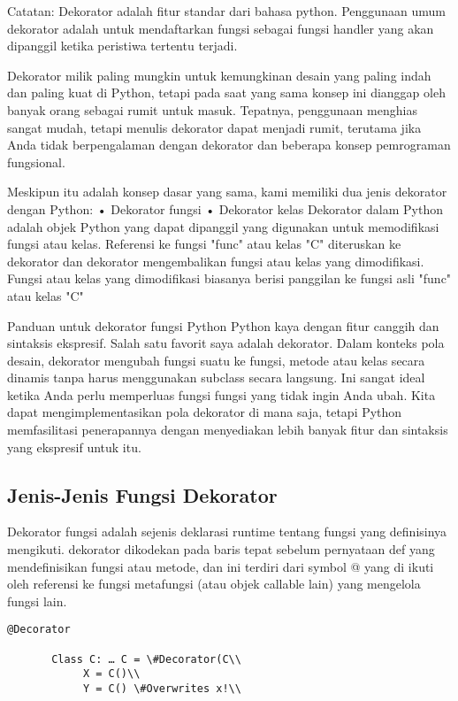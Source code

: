 \documentclass[12pt,a4paper]{article}
\begin{document}
Catatan:
Dekorator adalah fitur standar dari bahasa python. Penggunaan umum dekorator adalah untuk mendaftarkan fungsi sebagai fungsi handler yang akan dipanggil ketika peristiwa tertentu terjadi.

Dekorator milik paling mungkin untuk kemungkinan desain yang paling indah dan paling kuat di Python, tetapi pada saat yang sama konsep ini dianggap oleh banyak orang sebagai rumit untuk masuk. Tepatnya, penggunaan menghias sangat mudah, tetapi menulis dekorator dapat menjadi rumit, terutama jika Anda tidak berpengalaman dengan dekorator dan beberapa konsep pemrograman fungsional. 

Meskipun itu adalah konsep dasar yang sama, kami memiliki dua jenis dekorator dengan Python:
•	Dekorator fungsi
•	Dekorator kelas
Dekorator dalam Python adalah objek Python yang dapat dipanggil yang digunakan untuk memodifikasi fungsi atau kelas. Referensi ke fungsi "func" atau kelas "C" diteruskan ke dekorator dan dekorator mengembalikan fungsi atau kelas yang dimodifikasi. Fungsi atau kelas yang dimodifikasi biasanya berisi panggilan ke fungsi asli "func" atau kelas 
"C"


Panduan untuk dekorator fungsi Python
Python kaya dengan fitur canggih dan sintaksis ekspresif. Salah satu favorit saya adalah dekorator. Dalam konteks pola desain, dekorator mengubah fungsi suatu ke fungsi, metode atau kelas secara dinamis tanpa harus menggunakan subclass secara langsung. Ini sangat ideal ketika Anda perlu memperluas fungsi fungsi yang tidak ingin Anda ubah. Kita dapat mengimplementasikan pola dekorator di mana saja, tetapi Python memfasilitasi penerapannya dengan menyediakan lebih banyak fitur dan sintaksis yang ekspresif untuk itu.

\subsection{Jenis-Jenis Fungsi Dekorator}


Dekorator fungsi adalah sejenis deklarasi runtime tentang fungsi yang definisinya mengikuti. dekorator dikodekan pada baris tepat sebelum pernyataan def yang mendefinisikan fungsi atau metode, dan ini terdiri dari symbol @ yang di ikuti oleh referensi ke fungsi metafungsi (atau objek callable lain) yang mengelola fungsi lain.


\begin{verbatim}
@Decorator

       Class C: … C = \#Decorator(C\\
            X = C()\\
            Y = C() \#Overwrites x!\\
\end{verbatim}
            
\end{document}

